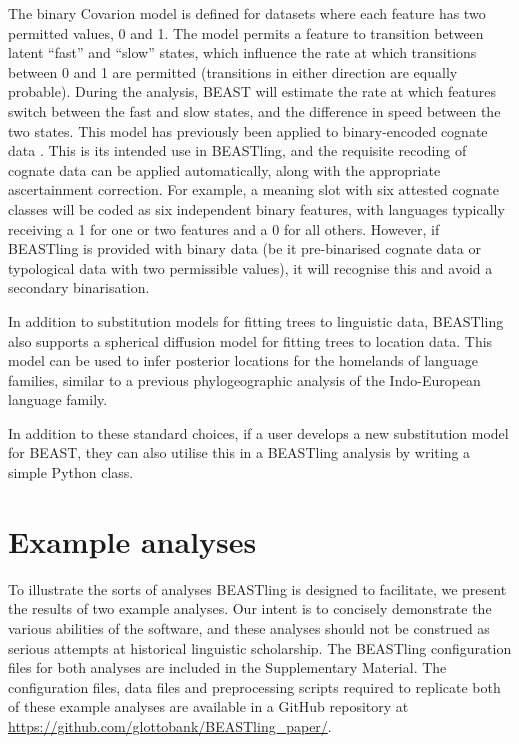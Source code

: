 \documentclass[10pt,a4paper]{article}
\begin{document}
The binary Covarion model\cite{Penny2001} is defined for datasets where each feature has two permitted values, 0 and 1.  The model permits a feature to transition between latent ``fast'' and ``slow'' states, which influence the rate at which transitions between 0 and 1 are permitted (transitions in either direction are equally probable).  During the analysis, BEAST will estimate the rate at which features switch between the fast and slow states, and the difference in speed between the two states.  This model has previously been applied to binary-encoded cognate data \cite{Gray2009,Bouckaert2012}.  This is its intended use in BEASTling, and the requisite recoding of cognate data can be applied automatically, along with the appropriate ascertainment correction.  For example, a meaning slot with six attested cognate classes will be coded as six independent binary features, with languages typically receiving a 1 for one or two features and a 0 for all others.  However, if BEASTling is provided with binary data (be it pre-binarised cognate data or typological data with two permissible values), it will recognise this and avoid a secondary binarisation.

In addition to substitution models for fitting trees to linguistic data, BEASTling also supports a spherical diffusion model\cite{Bouckaert2016} for fitting trees to location data.  This model can be used to infer posterior locations for the homelands of language families, similar to a previous phylogeographic analysis of the Indo-European language family\cite{Bouckaert2012}.

In addition to these standard choices, if a user develops a new substitution model for BEAST, they can also utilise this in a BEASTling analysis by writing a simple Python class.

\section{Example analyses}

To illustrate the sorts of analyses BEASTling is designed to facilitate, we present the results of two example analyses.  Our intent is to concisely demonstrate the various abilities of the software, and these analyses should not be construed as serious attempts at historical linguistic scholarship.  The BEASTling configuration files for both analyses are included in the Supplementary Material.  The configuration files, data files and preprocessing scripts required to replicate both of these example analyses are available in a GitHub repository at \url{https://github.com/glottobank/BEASTling_paper/}.
\end{document}
